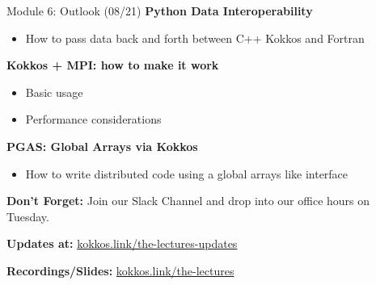 \begin{frame}{Module 6: Outlook (08/21)}
    \vspace{-3pt}
	\textbf{Python Data Interoperability}
	\begin{itemize}
        \item {How to pass data back and forth between C++ Kokkos and Fortran}
	\end{itemize}
	
	\vspace{5pt}
	\textbf{Kokkos + MPI: how to make it work}
	\begin{itemize}
		\item {Basic usage}
		\item {Performance considerations}
	\end{itemize}

	\vspace{5pt}
	\textbf{PGAS: Global Arrays via Kokkos}
	\begin{itemize}
		\item {How to write distributed code using a global arrays like interface}
	\end{itemize}

	\vspace{5pt}
	\textbf{Don't Forget:} Join our Slack Channel and drop into our office hours on Tuesday.
	
	\vspace{5pt}
	\textbf{Updates at:} \href{https://kokkos.link/the-lectures-updates}{kokkos.link/the-lectures-updates}
	
	\vspace{5pt}
	\textbf{Recordings/Slides:} \href{https://kokkos.link/the-lectures}{kokkos.link/the-lectures}

\end{frame}



